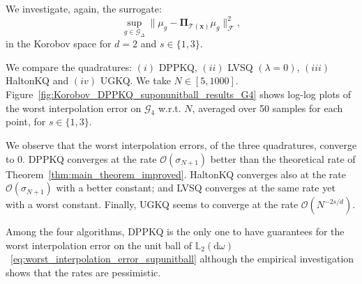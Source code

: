 \documentclass[twoside,11pt]{book}
\numberwithin{theorem}{chapter}
\numberwithin{definition}{chapter}
\numberwithin{proposition}{chapter}
\numberwithin{corollary}{chapter}
\numberwithin{example}{chapter}
\numberwithin{lemma}{chapter}
\begin{document}

We investigate, again, the surrogate:
\begin{equation}\label{eq:surrogate_worst_inerpolation_error_2}
\sup\limits_{g \in \mathcal{G}_{\Delta} } \|\mu_{g}-\bm{\Pi}_{\mathcal{T}(\bm{x})} \mu_{g}\|_{\mathcal{F}}^{2},
\end{equation}
in the Korobov space for $d =2$ and $s \in \{1,3\}$.



We compare the quadratures: $(i)$ DPPKQ, $(ii)$ LVSQ $(\lambda = 0)$, $(iii)$ HaltonKQ and $(iv)$ UGKQ. We take $N \in [5,1000]$. Figure~\ref{fig:Korobov_DPPKQ_suponunitball_results_G4} shows log-log plots of the worst interpolation error on $\mathcal{G}_{4}$ w.r.t. $N$, averaged over 50 samples for each point, for $s \in \{1,3\}$. 

We observe that the worst interpolation errors, of the three quadratures, converge  to $0$. DPPKQ converges at the rate $\mathcal{O}(\sigma_{N+1})$ better than the theoretical rate of Theorem~\ref{thm:main_theorem_improved}. HaltonKQ converges also at the rate $\mathcal{O}(\sigma_{N+1})$ with a better constant; and LVSQ converges at the same rate yet with a worst constant. Finally, UGKQ seems to converge at the rate $\mathcal{O}(N^{-2s/d})$. 

Among the four algorithms, DPPKQ is the only one to have guarantees for the worst interpolation error on the unit ball of $\mathbb{L}_{2}(\mathrm{d}\omega)$~\eqref{eq:worst_interpolation_error_supunitball} although the empirical investigation shows that the rates are pessimistic.
\end{document}
